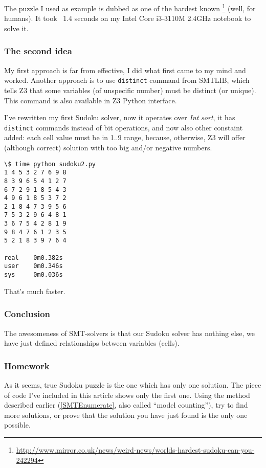 The puzzle I used as example is dubbed as one of the hardest known
\footnote{\url{http://www.mirror.co.uk/news/weird-news/worlds-hardest-sudoku-can-you-242294}} (well, for humans).
It took ~1.4 seconds on my Intel Core i3-3110M 2.4GHz notebook to solve it. %

\subsubsection{The second idea}

My first approach is far from effective, I did what first came to my mind and worked.
Another approach is to use \texttt{distinct} command from SMTLIB, which tells Z3 that some variables (of unspecific number) must be distinct (or unique).
This command is also available in Z3 Python interface.

I've rewritten my first Sudoku solver, now it operates over \textit{Int} \textit{sort}, it has \texttt{distinct} commands instead of bit operations,
and now also other constaint added: each cell value must be in 1..9 range, because, otherwise, Z3 will offer (although correct) solution with too big
and/or negative numbers.



\begin{lstlisting}
\$ time python sudoku2.py
1 4 5 3 2 7 6 9 8
8 3 9 6 5 4 1 2 7
6 7 2 9 1 8 5 4 3
4 9 6 1 8 5 3 7 2
2 1 8 4 7 3 9 5 6
7 5 3 2 9 6 4 8 1
3 6 7 5 4 2 8 1 9
9 8 4 7 6 1 2 3 5
5 2 1 8 3 9 7 6 4

real    0m0.382s
user    0m0.346s
sys     0m0.036s
\end{lstlisting}

That's much faster.

\subsubsection{Conclusion}

The awesomeness of \ac{SMT}-solvers is that our Sudoku solver has nothing else, we have just defined relationships between variables (cells).

\subsubsection{Homework}

As it seems, true Sudoku puzzle is the one which has only one solution.
The piece of code I've included in this article shows only the first one.
Using the method described earlier (\ref{SMTEnumerate}, also called ``model counting''), 
try to find more solutions, or prove that the solution you have just found is the only one possible.

